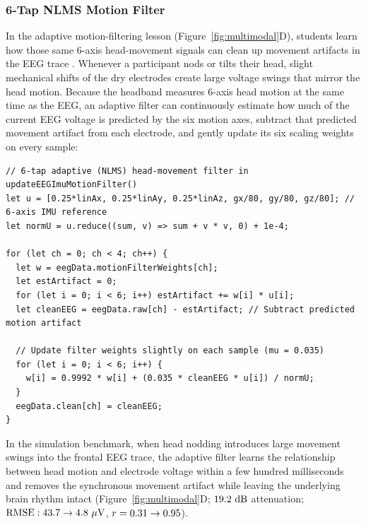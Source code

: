 \documentclass[11pt]{article}
\begin{document}
\subsubsection{6-Tap NLMS Motion Filter}
In the adaptive motion-filtering lesson (Figure~\ref{fig:multimodal}D), students learn how those same 6-axis head-movement signals can clean up movement artifacts in the EEG trace \citep{widrow1975adaptive,rosanne2021adaptive,klug2022bemobil,mathewson2024moving}. Whenever a participant nods or tilts their head, slight mechanical shifts of the dry electrodes create large voltage swings that mirror the head motion. Because the headband measures 6-axis head motion at the same time as the EEG, an adaptive filter can continuously estimate how much of the current EEG voltage is predicted by the six motion axes, subtract that predicted movement artifact from each electrode, and gently update its six scaling weights on every sample:

\noindent\begin{minipage}{\textwidth}
\begin{lstlisting}
// 6-tap adaptive (NLMS) head-movement filter in updateEEGImuMotionFilter()
let u = [0.25*linAx, 0.25*linAy, 0.25*linAz, gx/80, gy/80, gz/80]; // 6-axis IMU reference
let normU = u.reduce((sum, v) => sum + v * v, 0) + 1e-4;

for (let ch = 0; ch < 4; ch++) {
  let w = eegData.motionFilterWeights[ch];
  let estArtifact = 0;
  for (let i = 0; i < 6; i++) estArtifact += w[i] * u[i];
  let cleanEEG = eegData.raw[ch] - estArtifact; // Subtract predicted motion artifact

  // Update filter weights slightly on each sample (mu = 0.035)
  for (let i = 0; i < 6; i++) {
    w[i] = 0.9992 * w[i] + (0.035 * cleanEEG * u[i]) / normU;
  }
  eegData.clean[ch] = cleanEEG;
}
\end{lstlisting}
\end{minipage}
\vspace{4pt}

In the simulation benchmark, when head nodding introduces large movement swings into the frontal EEG trace, the adaptive filter learns the relationship between head motion and electrode voltage within a few hundred milliseconds and removes the synchronous movement artifact while leaving the underlying brain rhythm intact (Figure~\ref{fig:multimodal}D; $19.2\text{ dB}$ attenuation; $\text{RMSE}: 43.7 \rightarrow 4.8\ \mu\text{V}$, $r = 0.31 \rightarrow 0.95$).
\end{document}
